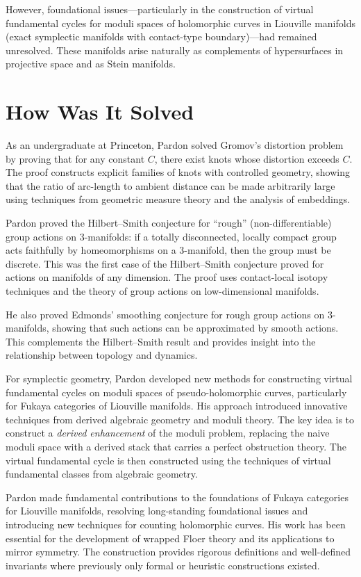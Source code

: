 However, foundational issues---particularly in the construction of virtual fundamental cycles for moduli spaces of holomorphic curves in Liouville manifolds (exact symplectic manifolds with contact-type boundary)---had remained unresolved. These manifolds arise naturally as complements of hypersurfaces in projective space and as Stein manifolds.

\section{How Was It Solved}

As an undergraduate at Princeton, Pardon solved Gromov's distortion problem by proving that for any constant $C$, there exist knots whose distortion exceeds $C$. The proof constructs explicit families of knots with controlled geometry, showing that the ratio of arc-length to ambient distance can be made arbitrarily large using techniques from geometric measure theory and the analysis of embeddings.

Pardon proved the Hilbert--Smith conjecture for ``rough'' (non-differentiable) group actions on 3-manifolds: if a totally disconnected, locally compact group acts faithfully by homeomorphisms on a 3-manifold, then the group must be discrete. This was the first case of the Hilbert--Smith conjecture proved for actions on manifolds of any dimension. The proof uses contact-local isotopy techniques and the theory of group actions on low-dimensional manifolds.

He also proved Edmonds' smoothing conjecture for rough group actions on 3-manifolds, showing that such actions can be approximated by smooth actions. This complements the Hilbert--Smith result and provides insight into the relationship between topology and dynamics.

For symplectic geometry, Pardon developed new methods for constructing virtual fundamental cycles on moduli spaces of pseudo-holomorphic curves, particularly for Fukaya categories of Liouville manifolds. His approach introduced innovative techniques from derived algebraic geometry and moduli theory. The key idea is to construct a \emph{derived enhancement} of the moduli problem, replacing the naive moduli space with a derived stack that carries a perfect obstruction theory. The virtual fundamental cycle is then constructed using the techniques of virtual fundamental classes from algebraic geometry.

Pardon made fundamental contributions to the foundations of Fukaya categories for Liouville manifolds, resolving long-standing foundational issues and introducing new techniques for counting holomorphic curves. His work has been essential for the development of wrapped Floer theory and its applications to mirror symmetry. The construction provides rigorous definitions and well-defined invariants where previously only formal or heuristic constructions existed.

